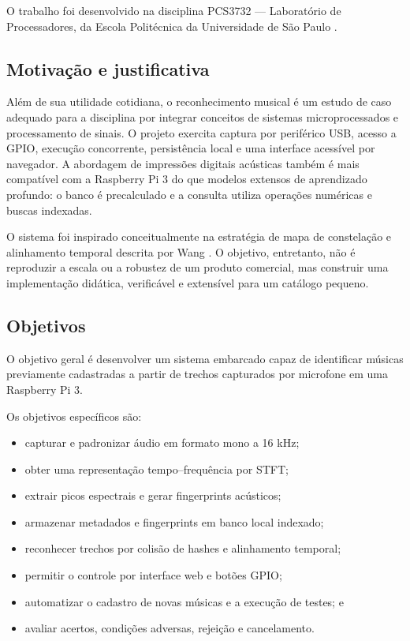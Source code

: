 \documentclass[12pt,a4paper]{article}
\begin{document}
O trabalho foi desenvolvido na disciplina PCS3732 --- Laboratório de
Processadores, da Escola Politécnica da Universidade de São Paulo
\cite{usp2026}.

\subsection{Motivação e justificativa}

Além de sua utilidade cotidiana, o reconhecimento musical é um estudo de caso
adequado para a disciplina por integrar conceitos de sistemas microprocessados e
processamento de sinais. O projeto exercita captura por periférico USB, acesso a
GPIO, execução concorrente, persistência local e uma interface acessível por
navegador. A abordagem de impressões digitais acústicas também é mais compatível
com a Raspberry Pi 3 do que modelos extensos de aprendizado profundo: o banco é
precalculado e a consulta utiliza operações numéricas e buscas indexadas.

O sistema foi inspirado conceitualmente na estratégia de mapa de constelação e
alinhamento temporal descrita por Wang \cite{wang2003}. O objetivo, entretanto,
não é reproduzir a escala ou a robustez de um produto comercial, mas construir
uma implementação didática, verificável e extensível para um catálogo pequeno.

\subsection{Objetivos}

O objetivo geral é desenvolver um sistema embarcado capaz de identificar músicas
previamente cadastradas a partir de trechos capturados por microfone em uma
Raspberry Pi 3.

Os objetivos específicos são:

\begin{itemize}
    \item capturar e padronizar áudio em formato mono a 16 kHz;
    \item obter uma representação tempo--frequência por STFT;
    \item extrair picos espectrais e gerar fingerprints acústicos;
    \item armazenar metadados e fingerprints em banco local indexado;
    \item reconhecer trechos por colisão de hashes e alinhamento temporal;
    \item permitir o controle por interface web e botões GPIO;
    \item automatizar o cadastro de novas músicas e a execução de testes; e
    \item avaliar acertos, condições adversas, rejeição e cancelamento.
\end{itemize}
\end{document}
